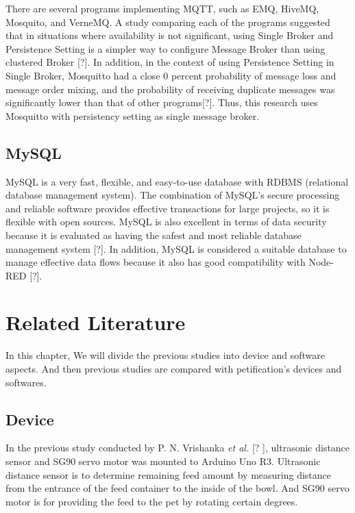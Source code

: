 \documentclass[conference]{IEEEtran}
\begin{document}
There are several programs implementing MQTT, such as EMQ, HiveMQ, Mosquito, and VerneMQ. A study comparing each of the programs suggested that in situations where availability is not significant, using Single Broker and Persistence Setting is a simpler way to configure Message Broker than using clustered Broker [?]. In addition, in the context of using Persistence Setting in Single Broker, Mosquitto had a close 0 percent probability of message loss and message order mixing, and the probability of receiving duplicate messages was significantly lower than that of other programs[?]. Thus, this research uses Mosquitto with persistency setting as single message broker.

\subsection{MySQL}
MySQL is a very fast, flexible, and easy-to-use database with RDBMS (relational database management system). The combination of MySQL's secure processing and reliable software provides effective transactions for large projects, so it is flexible with open sources. MySQL is also excellent in terms of data security because it is evaluated as having the safest and most reliable database management system [?]. In addition, MySQL is considered a suitable database to manage effective data flows because it also has good compatibility with Node-RED [?].


\section{Related Literature}
In this chapter, We will divide the previous studies into device and software aspects. And then previous studies are compared with petification's devices and softwares.

\subsection{Device}
In the previous study conducted by P. N. Vrishanka \textit{et al.} [?
], ultrasonic distance sensor and SG90 servo motor was mounted to Arduino Uno R3. Ultrasonic distance sensor is to determine remaining feed amount by measuring distance from the entrance of the feed container to the inside of the bowl. And SG90 servo motor is for providing the feed to the pet by rotating certain degrees.
\end{document}

